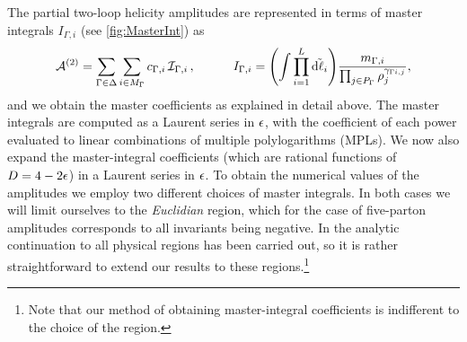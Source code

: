 The partial two-loop helicity amplitudes are represented in terms of master integrals $I_{\Gamma,i}$ (see \cref{fig:MasterInt}) as
\begin{equation} \label{eq:ampl_master_integrals}
  \mathcal{A}^{(2)}=\sum_{\Gamma\in\Delta}
  \sum_{i\in M_\Gamma} c_{\Gamma,i}\,
  \mathcal{I}_{\Gamma,i}\,,
  \quad
    \qquad I_{\Gamma,i} =
      \qty(\int \prod_{i=1}^{L} \tilde{\dd{\ell_i}}) \frac{m_{\Gamma,i}}{\prod_{j\in P_\Gamma} \rho_j^{\gamma_{\Gamma i,j}}},
\end{equation}
and we obtain the master coefficients as explained in detail above.
The master integrals are computed as a Laurent series in $\epsilon$, 
with the coefficient of each power evaluated to linear combinations of multiple polylogarithms (MPLs). 
We now also expand the master-integral coefficients (which are rational functions of $D=4-2\epsilon$) in a Laurent series in $\epsilon$.
To obtain the numerical values of the amplitudes we employ two different choices of master integrals.
In both cases we will limit ourselves to the \emph{Euclidian} region, which for the case of five-parton
amplitudes corresponds to all invariants being negative. In \cite{Gehrmann:2018yef} the analytic
continuation to all physical regions has been carried out, so it is rather straightforward to extend
our results to these regions.\footnote{
  Note that our method of obtaining master-integral coefficients is indifferent to the choice of the region.
}

